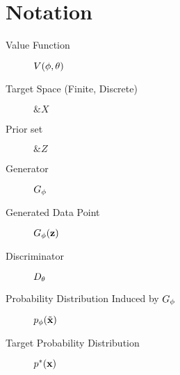 \section*{Notation}
\vspace{3cm}
\begin{center}
  \begin{minipage}[c]{0.7\linewidth}
    \begin{center}
      \vspace{1cm}
      \begin{description}
      \item[Value Function] \hfill $V(\phi, \theta)$
      \end{description}
      \begin{description}
      \item[Target Space (Finite, Discrete)] \hfill $\&X$
      \item[Prior set] \hfill $\&Z$
      \end{description}
      \begin{description}
      \item[Generator] \hfill $G_\phi$
      \item[Generated Data Point] \hfill $G_\phi(\mathbf{z})$
      \item[Discriminator] \hfill $D_\theta$
      \end{description}
      \begin{description}
      \item[Probability Distribution Induced by $G_\phi$] \hfill $p_{\phi}(\tilde{\mathbf{x}})$
      \item[Target Probability Distribution] \hfill $p^*(\mathbf{x})$
      \end{description}
    \end{center}
  \end{minipage}
\end{center}

